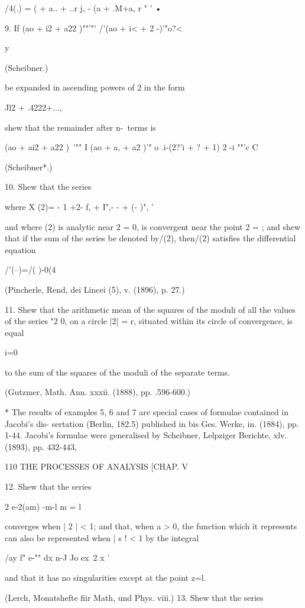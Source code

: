 {{{{/4(.) = ( + a.. + ..r j, - (a + .M+a, r " ' •

9. If (ao + i2 + a22 )""'"' /'(ao + i< + 2 -)'"o?<

y

(Scheibner.)

be expanded in ascending powers of 2 in the form

Jl2 + .4222+...,

shew that the remainder after n-\ terms is

(ao + ai2 + a22 )~'"" I (ao + a, + a2 )'" o .i-(2?'i + ? + 1) 2 -i
""'c C

(Scheibner*.)

10. Shew that the series

where X (2)= - 1 +2- f, + I",- - + (- )", '

and where (2) is analytic near 2 = 0, is convergent near the point 2 =
; and shew that if the sum of the series be denoted by/(2), then/(2)
satisfies the differential equation

/'(--)=/( )-0(4

(Pincherle, Rend, dei Lincei (5), v. (1896), p. 27.)

11. Shew that the arithmetic mean of the squares of the moduli of all
the values of the series "2 0, on a circle |2| = r, situated within
its circle of convergence, is equal

 i=0

to the sum of the squares of the moduli of the separate terms.

(Gutzmer, Math. Ann. xxxii. (1888), pp. .596-600.)

* The results of examples 5, 6 and 7 are special cases of formulae
contained in Jacobi's dis- sertation (Berlin, 182.5) published in bis
Ges. Werke, in. (1884), pp. 1-44. Jacobi's formulae were generalised
by Scheibner, Lelpziger Berichte, xlv. (1893), pp. 432-443,

110 THE PROCESSES OF ANALYSIS [CHAP. V

12. Shew that the series

2 e-2(am) -m-l m = l

converges when | 2 | < 1; and that, when a > 0, the function which it
represents can also be represented when | s ! < 1 by the integral

/ay f" e-"" dx n-J Jo ex\ 2 x '

and that it has no singularities except at the point z=l.

(Lerch, Monatshefte fiir Math, und Phys. viii.) 13. Shew that the
series

}}}}
